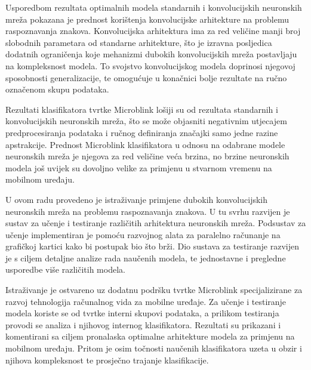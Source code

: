 \documentclass[lmodern, utf8, diplomski, numeric]{fer}
\begin{document}
Usporedbom rezultata optimalnih modela standarnih i konvolucijskih neuronskih mreža pokazana je prednost korištenja konvolucijske arhitekture na problemu raspoznavanja znakova. Konvolucijska arhitektura ima za red veličine manji broj slobodnih parametara od standarne arhitekture, što je izravna posljedica dodatnih ograničenja koje mehanizmi dubokih konvolucijskih mreža postavljaju na kompleksnost modela. To svojstvo konvolucijskog modela doprinosi njegovoj sposobnosti generalizacije, te omogućuje u konačnici bolje rezultate na ručno označenom skupu podataka.

Rezultati klasifikatora tvrtke Microblink lošiji su od rezultata standarnih i konvolucijskih neuronskih mreža, što se može objasniti negativnim utjecajem predprocesiranja podataka i ručnog definiranja značajki samo jedne razine apstrakcije. Prednost Microblink klasifikatora u odnosu na odabrane modele neuronskih mreža je njegova za red veličine veća brzina, no brzine neuronskih modela još uvijek su dovoljno velike za primjenu u stvarnom vremenu na mobilnom uređaju. 




\begin{sazetak}

U ovom radu provedeno je istraživanje primjene dubokih konvolucijskih neuronskih mreža na problemu raspoznavanja znakova. U tu svrhu razvijen je sustav za učenje i testiranje različitih arhitektura neuronskih mreža. Podsustav za učenje implementiran je pomoću razvojnog alata za paralelno računanje na grafičkoj kartici kako bi postupak bio što brži. Dio sustava za testiranje razvijen je s ciljem detaljne analize rada naučenih modela, te jednostavne i pregledne usporedbe više različitih modela. 

Istraživanje je ostvareno uz dodatnu podršku tvrtke Microblink specijalizirane za razvoj tehnologija računalnog vida za mobilne uređaje. Za učenje i testiranje modela koriste se od tvrtke interni skupovi podataka, a prilikom testiranja provodi se analiza i njihovog internog klasifikatora. 
Rezultati su prikazani i komentirani sa ciljem pronalaska optimalne arhitekture modela za primjenu na mobilnom uređaju. Pritom je osim točnosti naučenih klasifikatora uzeta u obzir i njihova kompleksnost te prosječno trajanje klasifikacije.

\end{sazetak}
\end{document}
